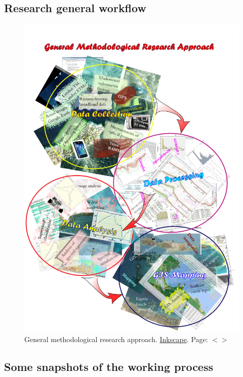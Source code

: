 \documentclass[11pt]{article}
\begin{document}
\begin{appendices}
\subsection{Research general workflow}
\begin{figure}[H]
	\centering
	\includegraphics[scale=0.57]{UML_GIS.png}
	\caption{General methodological research approach. \href{http://inkscape.org/}{Inkscape}. Page: $<$\pageref{page-9}$>$}
	\label{fig:1.11}
\end{figure}
\pagebreak

\subsection{Some snapshots of the working process}


\end{appendices}
\end{document}
